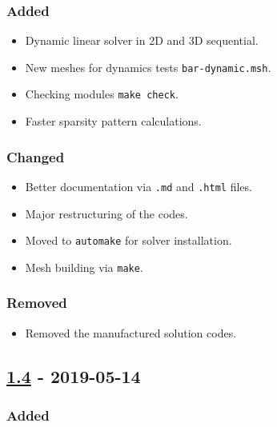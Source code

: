 \subsubsection{Added}\label{added-7}

\begin{itemize}
\tightlist
\item
  Dynamic linear solver in 2D and 3D sequential.
\item
  New meshes for dynamics tests \lstinline!bar-dynamic.msh!.
\item
  Checking modules \lstinline!make check!.
\item
  Faster sparsity pattern calculations.
\end{itemize}

\subsubsection{Changed}\label{changed-7}

\begin{itemize}
\tightlist
\item
  Better documentation via \lstinline!.md! and \lstinline!.html! files.
\item
  Major restructuring of the codes.
\item
  Moved to \lstinline!automake! for solver installation.
\item
  Mesh building via \lstinline!make!.
\end{itemize}

\subsubsection{Removed}\label{removed-3}

\begin{itemize}
\tightlist
\item
  Removed the manufactured solution codes.
\end{itemize}

\subsection{\texorpdfstring{\href{https://gitlab.com/PsdSolver/psd_sources/-/tree/v1.4}{1.4}
- 2019-05-14}{1.4 - 2019-05-14}}\label{section-7}

\subsubsection{Added}\label{added-8}

